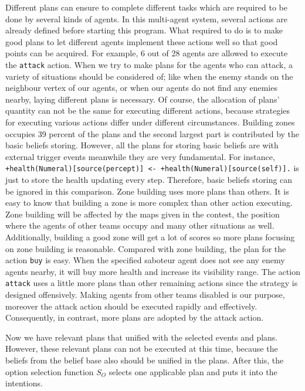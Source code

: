 Different plans can ensure to complete different tasks which are required to be done by several kinds of agents. In this multi-agent system, several actions are already defined before starting this program. What required to do is to make good plans to let different agents implement these actions well so that good points can be acquired. For example, 6 out of 28 agents are allowed to execute the \texttt{attack} action. When we try to make plans for the agents who can attack, a variety of situations should be considered of; like when the enemy stands on the neighbour vertex of our agents, or when our agents do not find any enemies nearby, laying different plans is necessary. Of course, the allocation of plans' quantity can not be the same for executing different actions, because strategies for executing various actions differ under different circumstances. Building zones occupies 39 percent of the plans and the second largest part is contributed by the basic beliefs storing. However, all the plans for storing basic beliefs are with external trigger events meanwhile they are very fundamental. For instance, \texttt{+health(Numeral)[source(percept)] <- +health(Numeral)[source(self)].} is just to store the health updating every step.
Therefore, basic beliefs storing can be ignored in this comparison. Zone building uses more plans than others. It is easy to know that building a zone is more complex than other action executing. Zone building will be affected by the maps given in the contest, the position where the agents of other teams occupy and many other situations as well. Additionally, building a good zone will get a lot of scores so more plans focusing on zone building is reasonable. Compared with zone building, the plan for the action \texttt{buy} is easy. When the specified saboteur agent does not see any enemy agents nearby, it will buy more health and increase its visibility range.
The action \texttt{attack} uses a little more plans than other remaining actions since the strategy is designed offensively. Making agents from other teams disabled is our purpose, moreover the attack action should be executed rapidly and effectively. Consequently, in contrast, more plans are adopted by the attack action.

Now we have relevant plans that unified with the selected events and plans. However, these relevant plans can not be executed at this time, because the beliefs from the belief base also should be unified in the plans. After this, the option selection function $S_O$ selects one applicable plan and puts it into the intentions.

